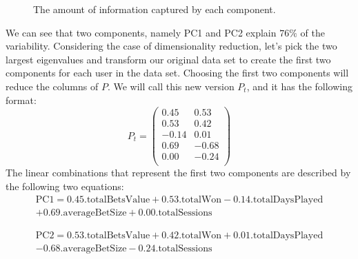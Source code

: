 \documentclass[600paper, 11pt,twoside,openany]{kdp}
\begin{document}
\begin{figure}[h!]
\begin{center}
\end{center}
\caption{The amount of information captured by each component.}
\end{figure}

\indent We can see that two components, namely PC1 and PC2 explain $76\%$ of the variability. Considering the case of dimensionality reduction, let’s pick the two largest eigenvalues and transform our original data set to create the first two components for each user in the data set. Choosing the first two components will reduce the columns of $P$. We will call this new version $P_t$, and it has the following format:
\[P_{t} = 
\begin{pmatrix}
  0.45 & 0.53 \\
  0.53 & 0.42 \\
 -0.14 & 0.01 \\ 
  0.69 & -0.68  \\ 
  0.00 & -0.24  \\
\end{pmatrix}
\]
\indent The linear combinations that represent the first two components are described by the following two equations:
\begin{equation}\label{eq:lepca2}
\begin{split}
\textrm{PC1} = 0.45.\textrm{totalBetsValue} + 0.53 .\textrm{totalWon} -0.14.\textrm{totalDaysPlayed} \\
 +  0.69.\textrm{averageBetSize} + 0.00.\textrm{totalSessions}
\end{split}
\end{equation}

\begin{equation}\label{eq:lepca3}
\begin{split}
\textrm{PC2} = 0.53.\textrm{totalBetsValue} + 0.42 .\textrm{totalWon} + 0.01.\textrm{totalDaysPlayed}\\
  -0.68.\textrm{averageBetSize} -0.24.\textrm{totalSessions}
\end{split}
\end{equation}
\end{document}
